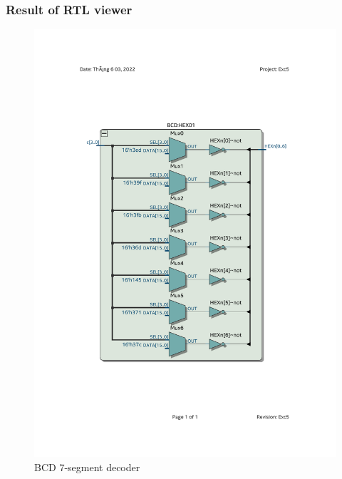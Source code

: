 \documentclass[13pt,a4paper]{report}
\begin{document}
\subsubsection{Result of RTL viewer}
\begin{figure}[H]
\centering
\includegraphics[scale=0.7, clip, trim={2cm 6.6cm 2cm 6.9cm}]{images/Exc5_BCD_RTL.pdf}
\caption*{BCD 7-segment decoder}
\end{figure}
\end{document}
